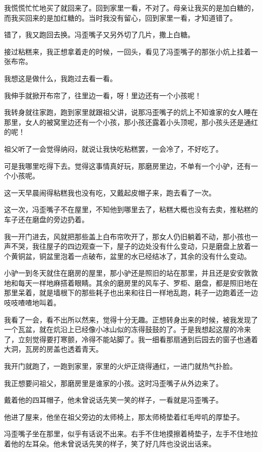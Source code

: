 \documentclass[UTF8]{ctexart}
\begin{document}
我慌慌忙忙地买了就回来了。回到家里一看，不对了。母亲让我买的是加白糖的，而我买回来的是加红糖的。当时我没有留心，回到家里一看，才知道错了。

错了，我又跑回去换。冯歪嘴子又另外切了几片，撒上白糖。

接过粘糕来，我正想拿着走的时候，一回头，看见了冯歪嘴子的那张小炕上挂着一张布帘。

我想这是做什么，我跑过去看一看。

我伸手就掀开布帘了，往里边一看，呀！里边还有一个小孩呢！

我转身就往家跑，跑到家里就跟祖父讲，说那冯歪嘴子的炕上不知谁家的女人睡在那里，女人的被窝里边还有一个小孩，那小孩还露着小头顶呢，那小孩头还是通红的呢！

祖父听了一会觉得纳闷，就说让我快吃粘糕罢，一会冷了，不好吃了。

可是我哪里吃得下去。觉得这事情真好玩，那磨房里边，不单有一个小驴，还有一个小孩呢。

这一天早晨闹得粘糕我也没有吃，又戴起皮帽子来，跑去看了一次。

这一次，冯歪嘴子不在屋里，不知他到哪里去了，粘糕大概也没有去卖，推粘糕的车子还在磨盘的旁边扔着。

我一开门进去，风就把那些盖上白布帘吹开了，那女人仍旧躺着不动，那小孩也一声不哭，我往屋子的四边观查一下，屋子的边处没有什么变动，只是磨盘上放着一个黄铜盆，铜盆里泡着一点破布，盆里的水已经结冰了，其余的没有什么变动。

小驴一到冬天就住在磨房的屋里，那小驴还是照旧的站在那里，并且还是安安敦敦地和每天一样地麻搭着眼睛。其余的磨房里的风车子、罗柜、磨盘，都是照旧地在那里呆着，就是墙根下的那些耗子也出来和往日一样地乱跑，耗子一边跑着还一边吱吱喳喳地叫着。

我看了一会，看不出所以然来，觉得十分无趣。正想转身出来的时候，被我发现了一个瓦盆，就在炕沿上已经像小冰山似的冻得鼓鼓的了。于是我想起这屋的冷来了，立刻觉得要打寒颤，冷得不能站脚了。我一细看那扇通到后园去的窗子也通着大洞，瓦房的房盖也透着青天。

我开门就跑了，一跑到家里，家里的火炉正烧得通红，一进门就热气扑脸。

我正想要问祖父，那磨房里是谁家的小孩。这时冯歪嘴子从外边来了。

戴着他的四耳帽子，他未曾说话先笑一笑的样子，一看就是冯歪嘴子。

他进了屋来，他坐在祖父旁边的太师椅上，那太师椅垫着红毛哔叽的厚垫子。

冯歪嘴子坐在那里，似乎有话说不出来。右手不住地摸擦着椅垫子，左手不住地拉着他的左耳朵。他未曾说话先笑的样子，笑了好几阵也没说出话来。
\end{document}
